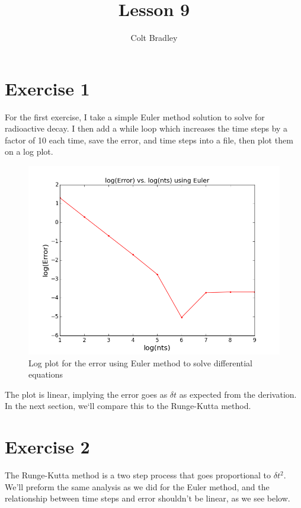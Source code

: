 \documentclass[11pt]{article}
\begin{document}
\title{Lesson 9}
\author{Colt Bradley}
\date{}
\maketitle

\section{Exercise 1}
For the first exercise, I take a simple Euler method solution to solve for radioactive decay. I then add a while loop which increases the time steps by a factor of 10 each time, save the error, and time steps into a file, then plot them on a log plot. 

\begin{figure}[ht]
\centering
\includegraphics[scale=.5]{eulererrorplot.png}
\caption{Log plot for the error using Euler method to solve differential equations }
\end{figure}

The plot is linear, implying the error goes as $\delta t$ as expected from the derivation. In the next section, we`ll compare this to the Runge-Kutta method.
 
\section{Exercise 2}
The Runge-Kutta method is a two step process that goes proportional to $\delta t^2$. We'll preform the same analysis as we did for the Euler method, and the relationship between time steps and error shouldn't be linear, as we see below. 
\end{document}
